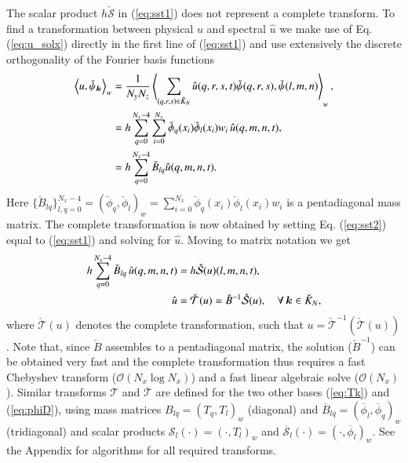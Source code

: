\documentclass[preprint]{elsarticle}
\newcommand{\N}[1]{\check{#1}}
\newcommand{\D}[1]{\overline{#1}}
\begin{document}
The scalar product  $h\N{\mathcal{S}}$ in (\ref{eq:sst1}) does not represent a 
complete transform. To find a transformation between physical $u$ and spectral 
$\hat{u}$ we make use of Eq. (\ref{eq:u_solx}) directly in the first line of (\ref{eq:sst1}) and use extensively the discrete 
orthogonality of the Fourier basis functions
\begin{align}
\left<u, \N{\psi}_{\bm{k}}\right>_w &= \frac{1}{N_yN_z}\left< 
\sum_{(q,r,s) \in \N{K}_N} \hat{u}(q,r,s,t) \N{\psi}(q,r,s), 
\N{\psi}(l,m,n) \right>_w, \notag \\
           &= h \sum_{q=0}^{N_x-4} \sum_{i=0}^{N_x} \N{\phi}_{q}(x_i) 
           \N{\phi}_{l}(x_i) w_i \, \hat{u}(q, {m}, {n}, t), \notag \\
           &= h \sum_{q=0}^{N_x-4} \N{B}_{lq} \hat{u}(q, {m}, {n}, t). 
           \label{eq:sst2}
\end{align}
Here $\{\N{B}_{lq}\}_{l,q=0}^{N_x-4} = (\N{\phi}_q, \N{\phi}_l)_w = 
\sum_{i=0}^{N_x} \N{\phi}_{q}(x_i) \N{\phi}_{l}(x_i) w_i$ is a 
pentadiagonal mass matrix. The complete transformation is now obtained by 
setting Eq. (\ref{eq:sst2}) equal to (\ref{eq:sst1}) and solving for $\hat{u}$. 
Moving to matrix notation we get
\begin{align}
h\sum_{q=0}^{N_x-4} \N{B}_{lq}\, \hat{u}(q, {m}, {n}, t) &= 
h\N{\mathcal{S}}(u)(l, m, n, t), \notag \\
 \hat{u} &= \N{\mathcal{T}}(u) =  \N{B}^{-1}\N{\mathcal{S}}(u), 
 \quad \forall \, \bm{k} \in \N{K}_N, \label{eq:fstB}
\end{align}
where $\N{\mathcal{T}}(u)$ denotes the complete transformation, such that $u = 
\N{\mathcal{T}}^{-1}(\N{\mathcal{T}}(u))$. Note that, since $\N{B}$ assembles to 
a pentadiagonal matrix, the solution ($\N{B}^{-1}$) can be obtained very fast and the complete 
transformation thus requires a fast Chebyshev transform ($\mathcal{O}(N_x \log N_x)$) and 
a fast linear algebraic solve ($\mathcal{O}(N_x)$). Similar transforms $\mathcal{T}$ 
and $\D{\mathcal{T}}$ are defined for the two other bases (\ref{eq:Tk}) and 
(\ref{eq:phiD}), using mass matrices $B_{lq}=(T_q, T_l)_w$ (diagonal) and 
$\D{B}_{lq}=(\D{\phi}_l, \D{\phi}_q)_w$ (tridiagonal) and scalar products 
$\mathcal{S}_l(\cdot) = (\cdot, T_l)_w$ and $\D{\mathcal{S}}_l(\cdot) = (\cdot, 
\D{\phi}_l)_w$. See the Appendix for algorithms for all required transforms.
\end{document}
